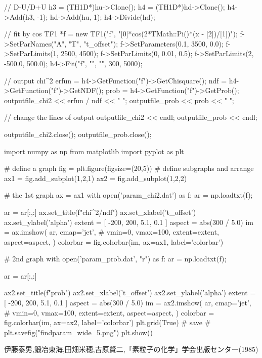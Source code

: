 \documentclass[dvipdfmx]{jsarticle}
\begin{document}
\begin{mylisting}[language=c++,caption=findPar.C]
{{{            // D-U/D+U
            h3 = (TH1D*)hu->Clone();
            h4 = (TH1D*)hd->Clone();
            h4->Add(h3, -1);
            hd->Add(hu, 1);
            h4->Divide(hd);

            // fit by cos
            TF1 *f = new TF1("f", "[0]*cos(2*TMath::Pi()*(x - [2])/[1])");
            f->SetParNames("A", "T", "t_offset");
            f->SetParameters(0.1, 3500, 0.0);
            f->SetParLimits(1, 2500, 4500);
            f->SetParLimits(0, 0.01, 0.5);
            f->SetParLimits(2, -500.0, 500.0);
            h4->Fit("f", "", "", 300, 5000);

            // output chi^2
            erfun = h4->GetFunction("f")->GetChisquare();
            ndf = h4->GetFunction("f")->GetNDF();
            prob = h4->GetFunction("f")->GetProb();
            outputfile_chi2 << erfun / ndf << " ";
            outputfile_prob << prob << " ";
        }
        // change the lines of output
        outputfile_chi2 << endl;
        outputfile_prob << endl;
    }
    outputfile_chi2.close();
    outputfile_prob.close();
}
\end{mylisting}

\begin{mylisting}[language=python,caption=plotError.py]
import numpy as np
from matplotlib import pyplot as plt

# define a graph
fig = plt.figure(figsize=(20,5))
# define subgraphs and arrange
ax1 = fig.add_subplot(1,2,1)
ax2 = fig.add_subplot(1,2,2)

# the 1st graph
ax = ax1
with open('param_chi2.dat') as f:
    ar = np.loadtxt(f);

ar = ar[:,:]
ax.set_title(f"chi^2/ndf")
ax.set_xlabel('t_offset')
ax.set_ylabel('alpha')
extent = [
    -200,
    200,
    5.1,
    0.1
]
aspect = abs(300 / 5.0)
im = ax.imshow(
    ar,
    cmap='jet',
    # vmin=0, vmax=100,
    extent=extent,
    aspect=aspect,
)
colorbar = fig.colorbar(im, ax=ax1, label='colorbar')

# 2nd graph
with open('param_prob.dat', "r") as f:
    ar = np.loadtxt(f);

ar = ar[:,:]

ax2.set_title(f"prob")
ax2.set_xlabel('t_offset')
ax2.set_ylabel('alpha')
extent = [
    -200,
    200,
    5.1,
    0.1
]
aspect = abs(300 / 5.0)
im = ax2.imshow(
    ar,
    cmap='jet',
    # vmin=0, vmax=100,
    extent=extent,
    aspect=aspect,
)
colorbar = fig.colorbar(im, ax=ax2, label='colorbar')
plt.grid(True)
# save
# plt.savefig("findparam_wide_5.png")
plt.show()
\end{mylisting}



\begin{thebibliography}{10}
     伊藤泰男,鍛冶東海,田畑米穂,吉原賢二,「素粒子の化学」学会出版センター(1985)
\end{thebibliography}
\end{document}
